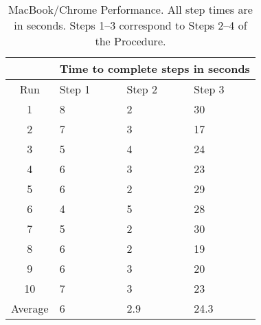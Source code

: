 \begin{table}
  \begin{center}
    \begin{tabularx}{275pt}{| c | X | X | X |}
    \hline
             & \multicolumn{3}{|c|}{Time to complete steps in seconds} \\ \hline
    Run      & Step 1 & Step 2 & Step 3 \\ \hline
    1        & 8      & 2      & 30     \\ \hline
    2        & 7      & 3      & 17     \\ \hline
    3        & 5      & 4      & 24     \\ \hline
    4        & 6      & 3      & 23     \\ \hline
    5        & 6      & 2      & 29     \\ \hline
    6        & 4      & 5      & 28     \\ \hline
    7        & 5      & 2      & 30     \\ \hline
    8        & 6      & 2      & 19     \\ \hline
    9        & 6      & 3      & 20     \\ \hline
    10       & 7      & 3      & 23     \\ \hline
    Average  & 6      & 2.9    & 24.3   \\
    \hline
  \end{tabularx}
  \caption{MacBook/Chrome Performance.  All step times are in seconds.  Steps 1--3 correspond to Steps 2--4 of the Procedure.}
  \label{mbChromePerf}
  \end{center}
\end{table}
